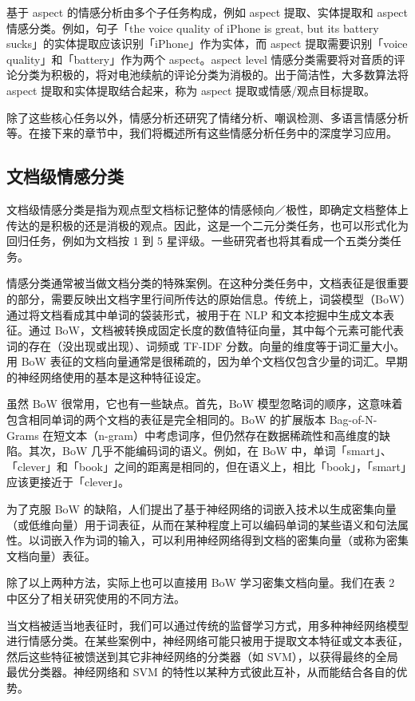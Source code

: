 \documentclass[lang=cn,11pt,a4paper]{elegantpaper}
\begin{document}
基于 aspect 的情感分析由多个子任务构成，例如 aspect 提取、实体提取和 aspect 情感分类。例如，句子「the voice quality of iPhone is great, but its battery sucks」的实体提取应该识别「iPhone」作为实体，而 aspect 提取需要识别「voice quality」和「battery」作为两个 aspect。aspect level 情感分类需要将对音质的评论分类为积极的，将对电池续航的评论分类为消极的。出于简洁性，大多数算法将 aspect 提取和实体提取结合起来，称为 aspect 提取或情感/观点目标提取。

除了这些核心任务以外，情感分析还研究了情绪分析、嘲讽检测、多语言情感分析等。在接下来的章节中，我们将概述所有这些情感分析任务中的深度学习应用。

\subsection{文档级情感分类}
文档级情感分类是指为观点型文档标记整体的情感倾向／极性，即确定文档整体上传达的是积极的还是消极的观点。因此，这是一个二元分类任务，也可以形式化为回归任务，例如为文档按 1 到 5 星评级。一些研究者也将其看成一个五类分类任务。

情感分类通常被当做文档分类的特殊案例。在这种分类任务中，文档表征是很重要的部分，需要反映出文档字里行间所传达的原始信息。传统上，词袋模型（BoW）通过将文档看成其中单词的袋装形式，被用于在 NLP 和文本挖掘中生成文本表征。通过 BoW，文档被转换成固定长度的数值特征向量，其中每个元素可能代表词的存在（没出现或出现）、词频或 TF-IDF 分数。向量的维度等于词汇量大小。用 BoW 表征的文档向量通常是很稀疏的，因为单个文档仅包含少量的词汇。早期的神经网络使用的基本是这种特征设定。

虽然 BoW 很常用，它也有一些缺点。首先，BoW 模型忽略词的顺序，这意味着包含相同单词的两个文档的表征是完全相同的。BoW 的扩展版本 Bag-of-N-Grams 在短文本（n-gram）中考虑词序，但仍然存在数据稀疏性和高维度的缺陷。其次，BoW 几乎不能编码词的语义。例如，在 BoW 中，单词「smart」、「clever」和「book」之间的距离是相同的，但在语义上，相比「book」，「smart」应该更接近于「clever」。

为了克服 BoW 的缺陷，人们提出了基于神经网络的词嵌入技术以生成密集向量（或低维向量）用于词表征，从而在某种程度上可以编码单词的某些语义和句法属性。以词嵌入作为词的输入，可以利用神经网络得到文档的密集向量（或称为密集文档向量）表征。

除了以上两种方法，实际上也可以直接用 BoW 学习密集文档向量。我们在表 2 中区分了相关研究使用的不同方法。

当文档被适当地表征时，我们可以通过传统的监督学习方式，用多种神经网络模型进行情感分类。在某些案例中，神经网络可能只被用于提取文本特征或文本表征，然后这些特征被馈送到其它非神经网络的分类器（如 SVM），以获得最终的全局最优分类器。神经网络和 SVM 的特性以某种方式彼此互补，从而能结合各自的优势。
\end{document}
